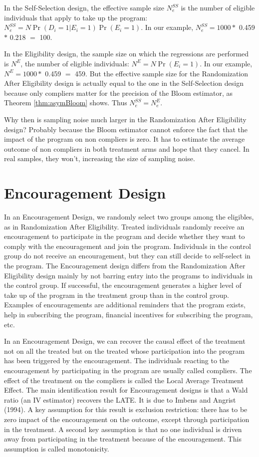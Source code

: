 \documentclass[
]{book}
\theoremstyle{definition}
\theoremstyle{definition}
\theoremstyle{definition}
\theoremstyle{definition}
\theoremstyle{remark}
\begin{document}
In the Self-Selection design, the effective sample size \(N^{SS}_e\) is the number of eligible individuals that apply to take up the program: \(N^{SS}_e=N\Pr(D_i=1|E_i=1)\Pr(E_i=1)\).
In our example, \(N^{SS}_e=1000 *\) 0.459 \(*\) 0.218 \(=\) 100.

In the Eligibility design, the sample size on which the regressions are performed is \(N^{E}\), the number of eligible individuals: \(N^{E}=N\Pr(E_i=1)\).
In our example, \(N^{E}=1000 *\) 0.459 \(=\) 459.
But the effective sample size for the Randomization After Eligibility design is actually equal to the one in the Self-Selection design because only compliers matter for the precision of the Bloom estimator, as Theorem \ref{thm:asymBloom} shows.
Thus \(N^{SS}_e=N^{E}_e\).

Why then is sampling noise much larger in the Randomization After Eligibility design?
Probably because the Bloom estimator cannot enforce the fact that the impact of the program on non compliers is zero.
It has to estimate the average outcome of non compliers in both treatment arms and hope that they cancel.
In real samples, they won't, increasing the size of sampling noise.

\hypertarget{sec:design4}{%
\section{Encouragement Design}\label{sec:design4}}

In an Encouragement Design, we randomly select two groups among the eligibles, as in Randomization After Eligibility.
Treated individuals randomly receive an encouragement to participate in the program and decide whether they want to comply with the encouragement and join the program.
Individuals in the control group do not receive an encouragement, but they can still decide to self-select in the program.
The Encouragement design differs from the Randomization After Eligibility design mainly by not barring entry into the programs to individuals in the control group.
If successful, the encouragement generates a higher level of take up of the program in the treatment group than in the control group.
Examples of encouragements are additional reminders that the program exists, help in subscribing the program, financial incentives for subscribing the program, etc.

In an Encouragement Design, we can recover the causal effect of the treatment not on all the treated but on the treated whose participation into the program has been triggered by the encouragement.
The individuals reacting to the encouragement by participating in the program are usually called compliers.
The effect of the treatment on the compliers is called the Local Average Treatment Effect.
The main identification result for Encouragement designs is that a Wald ratio (an IV estimator) recovers the LATE.
It is due to Imbens and Angrist (1994).
A key assumption for this result is exclusion restriction: there has to be zero impact of the encouragement on the outcome, except through participation in the treatment.
A second key assumption is that no one individual is driven away from participating in the treatment because of the encouragement.
This assumption is called monotonicity.
\end{document}
